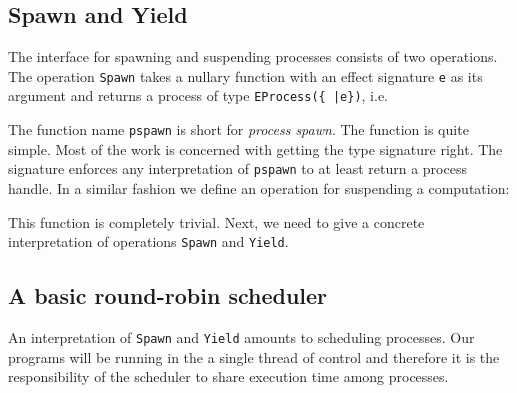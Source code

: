 \documentclass[12pt,mscres,cdtppar,twoside,openright,logo,rightchapter,normalheadings]{infthesis}
\newcommand{\snippet}[1]{}
\theoremstyle{definition}
\begin{document}
\subsection{Spawn and Yield}

The interface for spawning and suspending processes consists of two
operations. The operation \lstinline$Spawn$ takes a nullary
function with an effect signature \lstinline$e$ as its argument and
returns a process of type \lstinline$EProcess({ |e})$, i.e.
%
\snippet{pspawn.links}
%
The function name \lstinline$pspawn$ is short for \emph{process
  spawn}. The function is quite simple. Most of the work is concerned
with getting the type signature right. The signature enforces any
interpretation of \lstinline$pspawn$ to at least return a process
handle. In a similar fashion we define an operation for suspending a
computation:
%
\snippet{yield.links}
%
This function is completely trivial.  Next, we need to give a concrete
interpretation of operations \lstinline$Spawn$ and \lstinline$Yield$.

\subsection{A basic round-robin scheduler}

An interpretation of \lstinline$Spawn$ and \lstinline$Yield$ amounts
to scheduling processes. Our programs will be running in the a single
thread of control and therefore it is the responsibility of the
scheduler to share execution time among processes.
\end{document}
